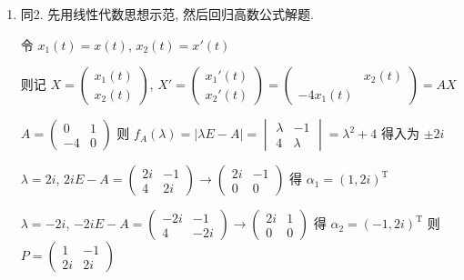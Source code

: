          \begin{enumerate}
             \item %
                   同2. 先用线性代数思想示范, 然后回归高数公式解题.

                   令 \( x_{1}(t) = x(t) \), \( x_{2}(t) = x'(t) \)

                   则记 \( X = \begin{pmatrix}
                       x_{1}(t) \\
                       x_{2}(t)
                   \end{pmatrix} \), \( X' = \begin{pmatrix}
                       x_{1}'(t) \\
                       x_{2}'(t)
                   \end{pmatrix} = \begin{pmatrix}
                                  & x_{2}(t) \\
                       -4x_{1}(t) &
                   \end{pmatrix} = AX \)

                   \( A = \begin{pmatrix}
                       0  & 1 \\
                       -4 & 0
                   \end{pmatrix} \) 则 \( f_{A}(\lambda) = |\lambda E - A| = \begin{vmatrix}
                       \lambda & -1      \\
                       4       & \lambda
                   \end{vmatrix} = \lambda^{2} + 4 \) 得入为 \( \pm 2i \)

                   \( \lambda = 2i \), \( 2iE - A = \begin{pmatrix}
                       2i & -1 \\
                       4  & 2i
                   \end{pmatrix} \rightarrow \begin{pmatrix}
                       2i & -1 \\
                       0  & 0
                   \end{pmatrix} \) 得 \( \alpha_{1} = (1, 2i)^{\mathrm{T}} \)

                   \( \lambda = -2i \), \( -2iE - A = \begin{pmatrix}
                       -2i & -1  \\
                       4   & -2i
                   \end{pmatrix} \rightarrow \begin{pmatrix}
                       2i & 1 \\
                       0  & 0
                   \end{pmatrix} \) 得 \( \alpha_{2} = (-1, 2i)^{\mathrm{T}} \) 则 \( P = \begin{pmatrix}
                       1  & -1 \\
                       2i & 2i
                   \end{pmatrix} \)


\end{enumerate}
